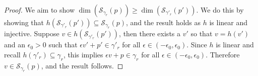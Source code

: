 \documentclass{article} %
\newcommand{\Sc}{\mathcal{S}}  %
\begin{document}
\begin{proof}
We aim to show $\dim(\Sc_{\gamma_r}(p)) \geq \dim(\Sc_{\gamma'_r}(p'))$.
  We do this by showing that $h(\Sc_{\gamma'_r}(p')) \subseteq \Sc_{\gamma_r}(p)$, and the result holds as $h$ is linear and injective.
Suppose $v \in h(\Sc_{\gamma'_r}(p'))$, then there exists a $v'$ so that $v = h(v')$ and an $\epsilon_0 > 0$ such that $\epsilon v' + p' \in \gamma'_r$ for all $\epsilon \in (-\epsilon_0, \epsilon_0)$.
Since $h$ is linear and recall $h(\gamma'_r) \subseteq \gamma_r$, this implies $\epsilon v + p \in \gamma_r$ for all $\epsilon \in (-\epsilon_0, \epsilon_0)$.
Therefore $v \in \Sc_{\gamma_r}(p)$, and the result follows. 
  
  

\end{proof}
\end{document}
